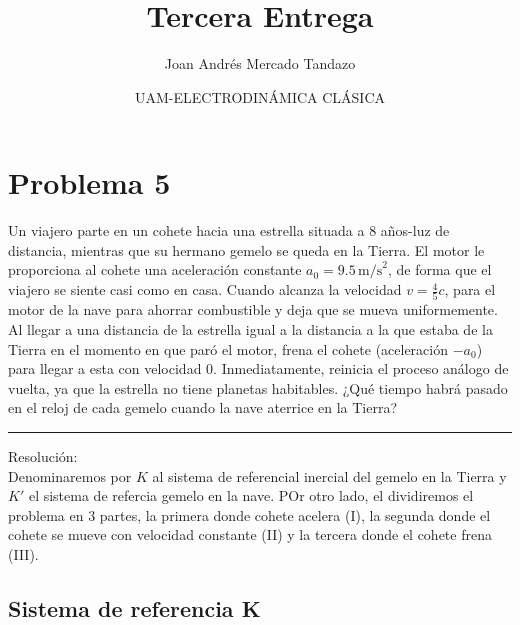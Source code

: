 \documentclass[11pt]{article}
\author{\Large Joan Andrés Mercado Tandazo}
\date{\Large UAM-ELECTRODINÁMICA CLÁSICA}
\title{\huge \textbf{Tercera Entrega}}
\begin{document}
\maketitle
\brightmode
\section*{Problema 5}
Un viajero parte en un cohete hacia una estrella situada a 8 años-luz
de distancia, mientras que su hermano gemelo se queda en la Tierra.
El motor le proporciona al cohete una aceleración constante $a_0 = 9.5 \, \text{m/s}^2$, de forma que el viajero se siente casi como en casa. Cuando alcanza
la velocidad $v = \frac{4}{5} c$, para el motor de la nave para ahorrar combustible
y deja que se mueva uniformemente. Al llegar a una distancia de la
estrella igual a la distancia a la que estaba de la Tierra en el momento
en que paró el motor, frena el cohete (aceleración $-a_0$) para llegar a
esta con velocidad 0. Inmediatamente, reinicia el proceso análogo de
vuelta, ya que la estrella no tiene planetas habitables. ¿Qué tiempo
habrá pasado en el reloj de cada gemelo cuando la nave aterrice en la
Tierra?
\vspace*{1em}
\hrule
\vspace*{1em}
{\color{blue} Resolución:}\\
Denominaremos por $K$ al sistema de referencial inercial del gemelo en la Tierra y $K'$ el sistema de refercia gemelo en la nave. POr otro lado, el dividiremos el problema en 3 partes, la primera donde cohete acelera (I), la segunda donde el cohete se mueve con velocidad constante (II) y la tercera donde el cohete frena (III).\par

\subsection*{Sistema de referencia K}
\end{document}
